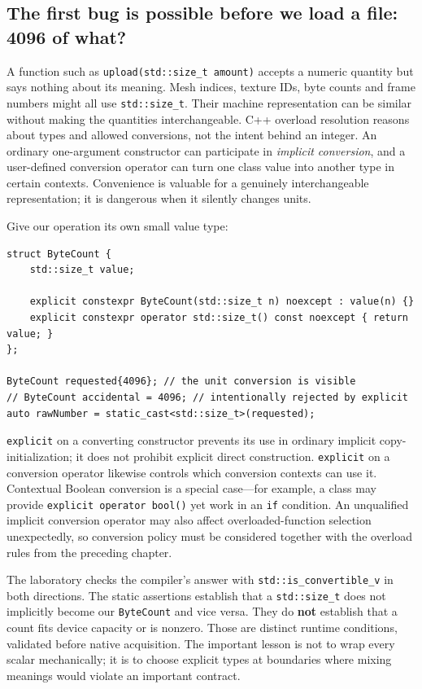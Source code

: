 \subsection{The first bug is possible before we load a file: 4096 of what?}\label{05-engine-i-ch004-the-first-bug-is-possible-before-we-load-a-file-4096-of-what}

A function such as \texttt{upload(std::size\_t\ amount)} accepts a numeric quantity but says nothing about its meaning. Mesh indices, texture IDs, byte counts and frame numbers might all use \texttt{std::size\_t}. Their machine representation can be similar without making the quantities interchangeable. C++ overload resolution reasons about types and allowed conversions, not the intent behind an integer. An ordinary one-argument constructor can participate in \emph{implicit conversion}, and a user-defined conversion operator can turn one class value into another type in certain contexts. Convenience is valuable for a genuinely interchangeable representation; it is dangerous when it silently changes units.

Give our operation its own small value type:

\begin{verbatim}
struct ByteCount {
    std::size_t value;

    explicit constexpr ByteCount(std::size_t n) noexcept : value(n) {}
    explicit constexpr operator std::size_t() const noexcept { return value; }
};

ByteCount requested{4096}; // the unit conversion is visible
// ByteCount accidental = 4096; // intentionally rejected by explicit
auto rawNumber = static_cast<std::size_t>(requested);
\end{verbatim}

\texttt{explicit} on a converting constructor prevents its use in ordinary implicit copy-initialization; it does not prohibit explicit direct construction. \texttt{explicit} on a conversion operator likewise controls which conversion contexts can use it. Contextual Boolean conversion is a special case---for example, a class may provide \texttt{explicit\ operator\ bool()} yet work in an \texttt{if} condition. An unqualified implicit conversion operator may also affect overloaded-function selection unexpectedly, so conversion policy must be considered together with the overload rules from the preceding chapter.

The laboratory checks the compiler's answer with \texttt{std::is\_convertible\_v} in both directions. The static assertions establish that a \texttt{std::size\_t} does not implicitly become our \texttt{ByteCount} and vice versa. They do \textbf{not} establish that a count fits device capacity or is nonzero. Those are distinct runtime conditions, validated before native acquisition. The important lesson is not to wrap every scalar mechanically; it is to choose explicit types at boundaries where mixing meanings would violate an important contract.

